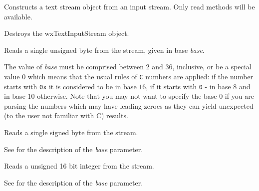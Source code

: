 Constructs a text stream object from an input stream. Only read methods will
be available.







Destroys the wxTextInputStream object.

\label{wxtextinputstreamread8}


Reads a single unsigned byte from the stream, given in base {\it base}.

The value of {\it base} must be comprised between $2$ and $36$, inclusive, or
be a special value $0$ which means that the usual rules of {\tt C} numbers are
applied: if the number starts with {\tt 0x} it is considered to be in base
$16$, if it starts with {\tt 0} - in base $8$ and in base $10$ otherwise. Note
that you may not want to specify the base $0$ if you are parsing the numbers
which may have leading zeroes as they can yield unexpected (to the user not
familiar with C) results.



Reads a single signed byte from the stream.

See  for the
description of the {\it base} parameter.



Reads a unsigned 16 bit integer from the stream.

See  for the
description of the {\it base} parameter.



